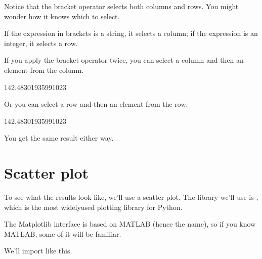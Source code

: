\documentclass[letterpaper,10pt,english]{sphinxmanual}
\begin{document}
Notice that the bracket operator selects both columns and rows.  You might wonder how it knows which to select.

If the expression in brackets is a string, it selects a column; if the expression is an integer, it selects a row.

If you apply the bracket operator twice, you can select a column and then an element from the column.

\begin{sphinxVerbatim}[commandchars=\\\{\}]
\PYG{p}{[}\PYG{p}{]}\PYG{p}{[}\PYG{p}{]}
\end{sphinxVerbatim}

\begin{sphinxVerbatim}[commandchars=\\\{\}]
142.48301935991023
\end{sphinxVerbatim}

Or you can select a row and then an element from the row.

\begin{sphinxVerbatim}[commandchars=\\\{\}]
\PYG{p}{[}\PYG{p}{]}\PYG{p}{[}\PYG{p}{]}
\end{sphinxVerbatim}

\begin{sphinxVerbatim}[commandchars=\\\{\}]
142.48301935991023
\end{sphinxVerbatim}

You get the same result either way.


\section{Scatter plot}
\label{\detokenize{03_motion:scatter-plot}}
To see what the results look like, we’ll use a scatter plot.  The library we’ll use is , which is the most widely\sphinxhyphen{}used plotting library for Python.

The Matplotlib interface is based on MATLAB (hence the name), so if you know MATLAB, some of it will be familiar.

We’ll import like this.

\begin{sphinxVerbatim}[commandchars=\\\{\}]
   
\end{sphinxVerbatim}
\end{document}
